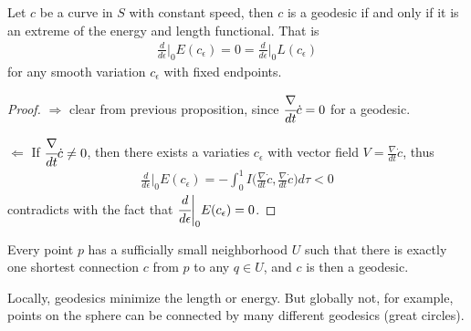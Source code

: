 \documentclass[10pt]{article}
\begin{document}
            \begin{theorem}
                Let $c$ be a curve in $S$ with constant speed, then $c$ is a geodesic if and only if it is an extreme of the energy and length functional. That is
                \begin{equation*}
                    \begin{aligned}
                        \frac{d}{d\epsilon}\bigg|_0E(c_\epsilon) = 0 = \frac{d}{d\epsilon}\bigg|_0L(c_\epsilon)
                    \end{aligned}
                \end{equation*}
                for any smooth variation $c_\epsilon$ with fixed endpoints.
            \end{theorem}
            \begin{proof}
                $\Longrightarrow$ clear from previous proposition, since $\cfrac{\nabla}{dt}\dot{c} = 0$ for a geodesic.
                
                $\Longleftarrow$ If $\cfrac{\nabla}{dt}\dot{c} \neq 0$, then there exists a variaties $c_\epsilon$ with vector field $V = \frac{\nabla}{dt}\dot{c}$, thus
                \begin{equation*}
                    \begin{aligned}
                        \frac{d}{d\epsilon}\bigg|_0E(c_\epsilon) = -\int_0^1I\bigg( \frac{\nabla}{dt}\dot{c}, \frac{\nabla}{dt}\dot{c} \bigg)d\tau < 0
                    \end{aligned}
                \end{equation*}
                contradicts with the fact that $\cfrac{d}{d\epsilon}\bigg|_0E(c_\epsilon) = 0$.
            \end{proof}

            \begin{remark}
                Every point $p$ has a sufficially small neighborhood $U$ such that there is exactly one shortest connection $c$ from $p$ to any $q\in U$, and $c$ is then a geodesic.

                Locally, geodesics minimize the length or energy. But globally not, for example, points on the sphere can be connected by many different geodesics (great circles).
            \end{remark}
\end{document}

